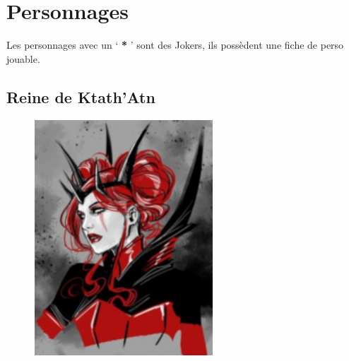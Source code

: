 \section{Personnages}
Les personnages avec un ‘ \textbf{*} ’ sont des Jokers, ils possèdent une fiche de perso jouable. 

\subsection{Reine de Ktath’Atn} \label{sec:ktath-atn-queen}
\begin{figure}[h!]
    \centering
    \includegraphics[height=250pt]{_img/pnjs/ktath-atn-queen.png}
\end{figure}
